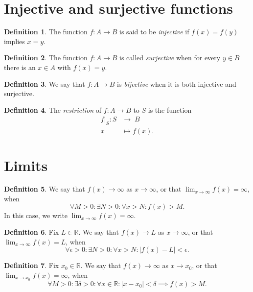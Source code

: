 \documentclass{article}
\theoremstyle{definition}
\newtheorem{definition}{Definition}
\newcommand{\R}{\mathbb{R}}
\begin{document}
\section*{Injective and surjective functions}

\begin{definition}
	The function $f:A\to B$ is said to be \emph{injective} if $f(x)=f(y)$ implies $x=y$.
\end{definition}

\begin{definition}
	The function $f:A\to B$ is called \emph{surjective} when for every $y\in B$ there is an $x\in A$ with $f(x)=y$.
\end{definition}

\begin{definition}
	We say that $f:A\to B$ is \emph{bijective} when it is both injective and surjective.
\end{definition}

\begin{definition}
	The \emph{restriction} of $f:A\to B$ to $S$ is the function
	\begin{align*}
		f|_S:	S	&\to		\;B	\\
			x	&\mapsto	f(x).
	\end{align*}
\end{definition}


\section*{Limits}

\begin{definition}
	We say that $f(x)\to\infty$ as $x\to\infty$, or that $\displaystyle\lim_{x\to\infty}f(x)=\infty$, when
	\[
		\forall M>0 : \exists N>0 : \forall x>N : f(x)>M.
	\]
	In this case, we write $\displaystyle\lim_{x\to\infty}f(x)=\infty$.
\end{definition}

\begin{definition}
	Fix $L\in\R$. We say that $f(x)\to L$ as $x\to\infty$, or that $\displaystyle\lim_{x\to\infty}f(x)=L$, when
	\[
		\forall \epsilon>0 : \exists N>0 : \forall x>N : |f(x)-L|<\epsilon.
	\]
\end{definition}

\begin{definition}
	Fix $x_0\in\R$. We say that $f(x)\to\infty$ as $x\to x_0$, or that $\displaystyle\lim_{x\to x_0}f(x)=\infty$, when
	\[
		\forall M>0 : \exists \delta>0 : \forall x\in\R : |x-x_0|<\delta \implies f(x)>M.
	\]
\end{definition}
\end{document}
